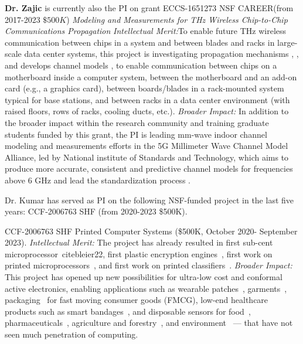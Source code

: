 \documentclass[11 pt]{article}
\begin{document}
{\bf Dr. Zajic} is currently also the PI on grant ECCS-1651273 NSF CAREER(from 2017-2023 $\$500K$) \textit{Modeling and Measurements for THz Wireless Chip-to-Chip Communications Propagation} \textit{Intellectual Merit:}To enable future THz wireless communication between chips in a system and between blades and racks in large-scale data center systems, this project is investigating  propagation mechanisms \cite{Cheng2020}, \cite{Kim2016}, \cite{Fu2019} and develops channel models \cite{Kim2016a}, \cite{Fu2020} to enable communication between chips on a motherboard inside a computer system, between the motherboard and an add-on card (e.g., a graphics card), between boards/blades in a rack-mounted system typical for base stations, and between racks in a data center environment (with raised floors, rows of racks, cooling ducts, etc.). \textit{Broader Impact:} In addition to the broader impact within the research community and training graduate students funded by this grant, the PI is leading mm-wave indoor channel modeling and measurements efforts in the 5G Millimeter Wave Channel Model Alliance, led by National institute of Standards and Technology, which aims to produce more accurate, consistent and predictive channel models for frequencies above 6 GHz and lead the standardization process \cite{Book}.

Dr. Kumar has served as PI on the following NSF-funded project in
the last five years: CCF-2006763 SHF (from 2020-2023 \$500K).

CCF-2006763 SHF Printed Computer Systems (\$500K, October 2020- September 2023).
\textit{Intellectual Merit:} The project has already resulted in first sub-cent microprocessor~cite{bleier22}, first plastic encryption engines~\cite{bleier23},
first work on printed microprocessors~\cite{bleier2020printed}, and first work on printed classifiers~\cite{mubarik20}.
\textit{Broader Impact:} This project has opened up new possibilities for ultra-low cost and conformal active electronics, enabling applications such as wearable patches~\cite{8502791},
garments~\cite{garments}, packaging~\cite{gethin2013printed} for fast moving consumer goods (FMCG), low-end healthcare products such as smart
bandages~\cite{DERAKHSHANDEH20181259}, and disposable sensors for food~\cite{7994325}, pharmaceuticals~\cite{BERGAMINI200554},
agriculture and forestry~\cite{chemosensors8040125}, and environment~\cite{MARRAZZA1999297} --- that have not seen much penetration of computing.



\end{document}

